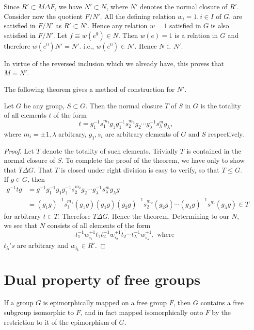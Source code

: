 Since $R' \subset M \Delta F$, we have $N' \subset N$, where $N'$
denotes the normal closure of $R'$. Consider now the quotient
$F/N'$. All the defining relation $w_i=1,i \in I$ of $G$, are
satisfied in $F/N'$ as $R' \subset N'$. Hence any relation $w=1$
satisfied in $G$ is also satisfied in $F/N'$. Let $f \equiv w(e^0)\in
N$. Then $w(e)=1$ is a relation in $G$ and therefore
$w(e^0)N'=N'$. i.e., $w(e^0)\in N'$. Hence $N \subset N'$.  

In virtue of the reversed inclusion which we already have, this proves
that $M=N'$. 

The following theorem gives a method of construction for $N'$.
\begin{Theorem}%
  Let $G$ be any group, $S \subset G$. Then the normal closure $T$ of
  $S$ in $G$ is the totality of all elements $t$ of the form 
  $$
  t=g^{-1}_1 s^{m_1}_1 g_1 g^{-1}_1 s_2^{m_2}g_2 \cdots g^{-1}_
  \lambda s_ \lambda^m g_ \lambda,
  $$
  where $m_i=\pm1, \lambda$ arbitrary, $g_1,s_i$ are arbitrary
  elements of $G$ and $S$ respectively. 
\end{Theorem}

\begin{proof}
  Let $T$ denote the totality of such elements. Trivially $T$ is
  contained in the normal closure of $S$. To complete the proof of the
  theorem, we have only to show that $T \Delta G$. That $T$ is closed
  under right division is easy to verify, so that $T \leq G$. If $g
  \in G$, then  
  \begin{align*}
    g^{-1}tg &=g^{-1}g^{-1}_1g_1g^{-1}_1 s^{m_2}_2 g_2 \cdots g^{-1}_
    \lambda s_ \lambda ^m g_ \lambda g\\ 
    &= (g_1 g)^{-1}s^{m_1}_1 (g_1 g)(g_1
    g)(g_2g)^{-1}s_2^{m_2}(g_2g)\cdots (g_ \lambda g)^{-1}s^{m} (g_
    \lambda g)\in T 
  \end{align*}
  for arbitrary  $t \in T$. Therefore $T \Delta G$. Hence the theorem.
  Determining to our $N$, we see that $N$ consists of all elements of
  the form 
  $$
  t^{-1}_1 w^{\pm 1}_{i_1}t_1t_2^{-1}w^{\pm 1}_{i_2} t_2 \cdots t_
  \lambda^{-1}w^{\pm 1}_{i_\lambda}, \text{ where } 
  $$
  $t_ \lambda 's$ are arbitrary and $w_{i_k}\in R'$.
\end{proof}

\section{Dual property of free groups} %

\begin{Theorem}%
  If a group $G$ is epimorphically mapped on a free group $F$, then
  $G$ contains a free subgroup isomorphic to $F$, and in fact mapped
  isomorphically onto $F$ by the restriction to it of the epimorphism
  of $G$. 
\end{Theorem}

